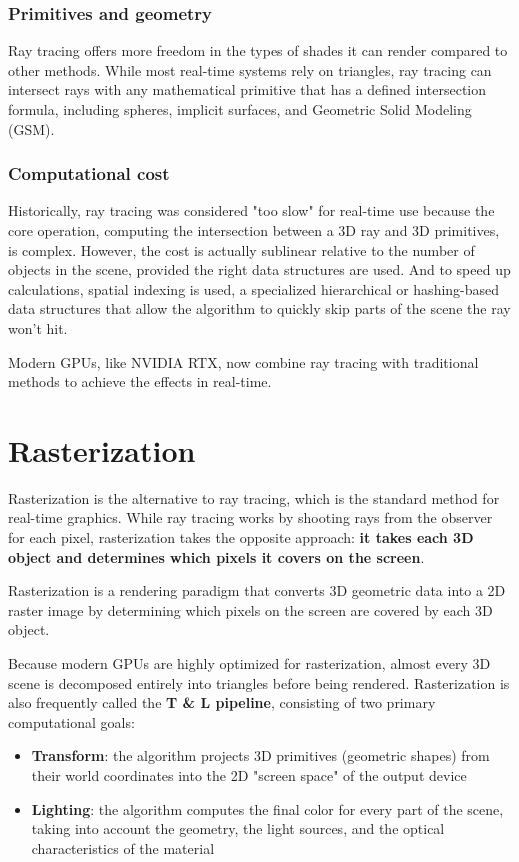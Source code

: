 \subsubsection{Primitives and geometry}
Ray tracing offers more freedom in the types of shades it can render compared to other methods. While most real-time systems rely on triangles, ray tracing can intersect rays with any mathematical primitive that has a defined intersection formula, including spheres, implicit surfaces, and Geometric Solid Modeling (GSM).

\subsubsection{Computational cost}
Historically, ray tracing was considered "too slow" for real-time use because the core operation, computing the intersection between a 3D ray and 3D primitives, is complex. However, the cost is actually sublinear relative to the number of objects in the scene, provided the right data structures are used. And to speed up calculations, spatial indexing is used, a specialized hierarchical or hashing-based data structures that allow the algorithm to quickly skip parts of the scene the ray won't hit.\par
Modern GPUs, like NVIDIA RTX, now combine ray tracing with traditional methods to achieve the effects in real-time.

\section{Rasterization}
Rasterization is the alternative to ray tracing, which is the standard method for real-time graphics. While ray tracing works by shooting rays from the observer for each pixel, rasterization takes the opposite approach: \textbf{it takes each 3D object and determines which pixels it covers on the screen}.
\begin{definition}[Rasterization]
    Rasterization is a rendering paradigm that converts 3D geometric data into a 2D raster image by determining which pixels on the screen are covered by each 3D object.
\end{definition}

Because modern GPUs are highly optimized for rasterization, almost every 3D scene is decomposed entirely into triangles before being rendered. Rasterization is also frequently called the \textbf{T \& L pipeline}, consisting of two primary computational goals:
\begin{itemize}[noitemsep]
    \item \textbf{Transform}: the algorithm projects 3D primitives (geometric shapes) from their world coordinates into the 2D "screen space" of the output device
    \item \textbf{Lighting}: the algorithm computes the final color for every part of the scene, taking into account the geometry, the light sources, and the optical characteristics of the material
\end{itemize}

